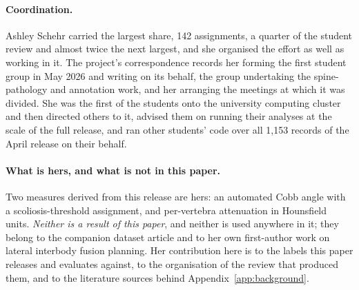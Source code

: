 \paragraph{Coordination.}
Ashley Schehr carried the largest share, 142 assignments, a quarter of the student review and almost twice
the next largest, and she organised the effort as well as working in it. The project's correspondence
records her forming the first student group in May 2026 and writing on its behalf, the group undertaking
the spine-pathology and annotation work, and her arranging the meetings at which it was divided. She was
the first of the students onto the university computing cluster and then directed others to it, advised
them on running their analyses at the scale of the full release, and ran other students' code over all
1{,}153 records of the April release on their behalf.

\paragraph{What is hers, and what is not in this paper.}
Two measures derived from this release are hers: an automated Cobb angle with a scoliosis-threshold
assignment, and per-vertebra attenuation in Hounsfield units. \emph{Neither is a result of this paper}, and
neither is used anywhere in it; they belong to the companion dataset article and to her own first-author
work on lateral interbody fusion planning. Her contribution here is to the labels this paper releases and
evaluates against, to the organisation of the review that produced them, and to the literature sources
behind Appendix~\ref{app:background}.
